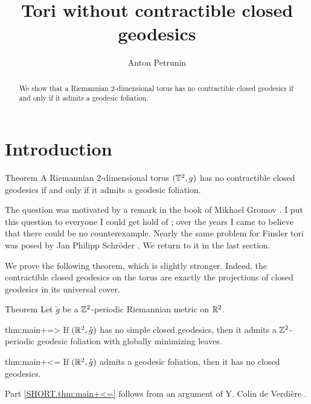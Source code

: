 \documentclass[a4paper,10pt]{article}
\def\thetitle{Tori without contractible closed geodesics}
\def\theauthors{Anton Petrunin}
\begin{document}
\title{\thetitle}
\author{\theauthors}
\date{}
\maketitle

\begin{abstract}
We show that a Riemannian 2-dimensional torus has no contractible closed geodesics if and only if it admits a geodesic foliation.
\end{abstract}

\section{Introduction}

\begin{thm}{Theorem}\label{thm:main}
A Riemannian 2-dimensional torus $(\mathbb{T}^2,g)$ has no contractible closed geodesics if and only if it admits a geodesic foliation.
\end{thm}

The question was motivated by a remark in the book of Mikhael Gromov \cite[7.9]{gromov}.
I put this question to everyone I could get hold of \cite{petrunin2022, petrunin2020}; over the years I came to believe that there could be no counterexample.
Nearly the same problem for Finsler tori was posed by Jan Philipp Schröder \cite[10.1]{schroeder-survey}.
We return to it in the last section.

We prove the following theorem, which is slightly stronger.
Indeed, the contractible closed geodesics on the torus are exactly the projections of closed geodesics in its universal cover.

\begin{thm}{Theorem}\label{thm:main+}
Let $\tilde g$ be a $\mathbb{Z}^2$-periodic Riemannian metric on $\mathbb{R}^2$.

\begin{subthm}{thm:main+=>}
 If $(\mathbb{R}^2, \tilde g)$ has no simple closed geodesics, then it admits a $\mathbb{Z}^2$-periodic geodesic foliation with globally minimizing leaves.
\end{subthm}

\begin{subthm}{thm:main+<=}
If $(\mathbb{R}^2, \tilde g)$ admits a geodesic foliation, then it has no closed geodesics.
\end{subthm}

\end{thm}

Part \ref{SHORT.thm:main+<=} follows from an argument of Y. Colin de Verdière \cite[7.9]{gromov}.
\end{document}
